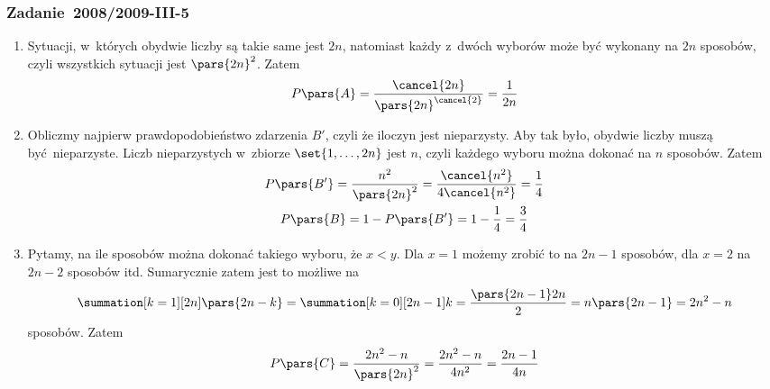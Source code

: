 \subsubsection*{Zadanie~2008/2009-III-5}
\begin{enumerate}[label={\Alph*:}]
    \item Sytuacji, w~których obydwie liczby są takie same jest \(2n\), natomiast każdy z~dwóch wyborów może być wykonany na \(2n\) sposobów, czyli wszystkich sytuacji jest \(\pars{2n}^2\). Zatem
        \begin{equation*}
            P\pars{A} = \frac{\cancel{2n}}{\pars{2n}^{\cancel{2}}} = \frac{1}{2n}
        \end{equation*}
    \item Obliczmy najpierw prawdopodobieństwo zdarzenia \(B'\), czyli że iloczyn jest nieparzysty. Aby tak było, obydwie liczby muszą być nieparzyste. Liczb nieparzystych w~zbiorze \(\set{1, \ldots, 2n}\) jest \(n\), czyli każdego wyboru można dokonać na \(n\) sposobów. Zatem
        \begin{gather*}
            P\pars{B'}
                = \frac{n^2}{\pars{2n}^2}
                = \frac{\cancel{n^2}}{4\cancel{n^2}}
                = \frac{1}{4}\\
            P\pars{B}
                = 1 - P\pars{B'}
                = 1 - \frac{1}{4}
                = \frac{3}{4}
        \end{gather*}
    \item Pytamy, na ile sposobów można dokonać takiego wyboru, że \(x < y\). Dla \(x = 1\) możemy zrobić to na \(2n - 1\) sposobów, dla \(x = 2\) na \(2n - 2\) sposobów itd. Sumarycznie zatem jest to możliwe na
        \begin{equation*}
            \summation[k = 1][2n] \pars{2n - k}
                = \summation[k = 0][2n - 1] k
                = \frac{\pars{2n - 1}2n}{2}
                = n\pars{2n - 1}
                = 2n^2 - n
        \end{equation*}
        sposobów. Zatem
        \begin{equation*}
            P\pars{C}
                = \frac{2n^2 - n}{\pars{2n}^2}
                = \frac{2n^2 - n}{4n^2}
                = \frac{2n - 1}{4n}
        \end{equation*}
\end{enumerate}

